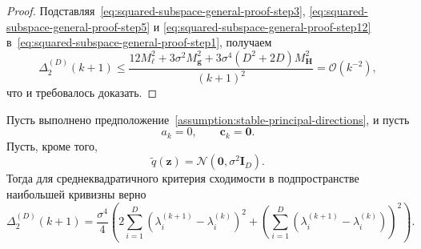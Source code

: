 \begin{proof}
    Подставляя~\eqref{eq:squared-subspace-general-proof-step3},
    \eqref{eq:squared-subspace-general-proof-step5} и
    \eqref{eq:squared-subspace-general-proof-step12}
    в~\eqref{eq:squared-subspace-general-proof-step1}, получаем
    \begin{equation}
        \Delta_2^{(D)}(k+1)
        \leqslant
        \frac{
            12M_\ell^2
            +
            3\sigma^2 M_{\mathbf g}^2
            +
            3\sigma^4(D^2+2D)M_{\mathbf H}^2
        }{(k+1)^2}
        = \mathcal{O}(k^{-2}),
    \end{equation}
    что и требовалось доказать.
\end{proof}

\begin{theorem}
    \label{thm:squared-subspace-hessian-eigs}
    Пусть выполнено предположение~\ref{assumption:stable-principal-directions}, и пусть
    \begin{equation}
        a_k = 0,
        \qquad
        \mathbf c_k = \mathbf 0.
    \end{equation}
    Пусть, кроме того,
    \begin{equation}
        \tilde q(\mathbf z)=\mathcal N(\mathbf 0, \sigma^2\mathbf I_D).
    \end{equation}
    Тогда для среднеквадратичного критерия сходимости в подпространстве наибольшей кривизны верно
    \begin{equation}
        \label{eq:squared-subspace-hessian-eigs-theorem}
        \Delta_{2}^{(D)}(k+1)
        =
        \frac{\sigma^4}{4}
        \left(
            2\sum_{i=1}^{D}
            \left(
                \lambda_i^{(k+1)}-\lambda_i^{(k)}
            \right)^2
            +
            \left(
                \sum_{i=1}^{D}
                \left(
                    \lambda_i^{(k+1)}-\lambda_i^{(k)}
                \right)
            \right)^2
        \right).
    \end{equation}
\end{theorem}

